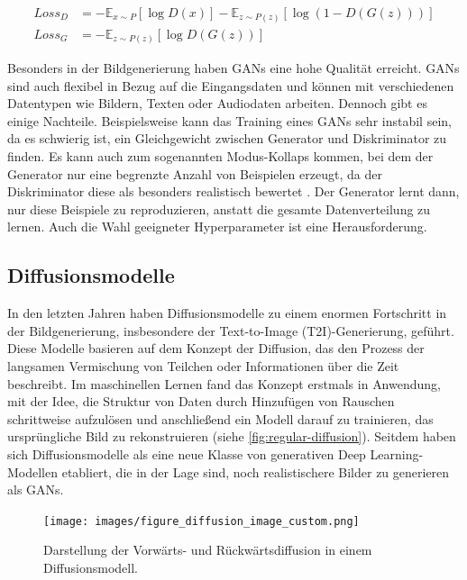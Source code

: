 \begin{equation}
	\begin{aligned}
		Loss_D &= -\mathbb{E}_{x \sim P}[\log D(x)] - \mathbb{E}_{z \sim P(z)}[\log(1 - D(G(z)))] \\
		Loss_G &= -\mathbb{E}_{z \sim P(z)}[\log D(G(z))]
	\end{aligned}
	\label{eq:gan-loss}
\end{equation}

Besonders in der Bildgenerierung haben GANs eine hohe Qualität erreicht. GANs sind auch flexibel in Bezug auf die Eingangsdaten und können mit verschiedenen Datentypen wie Bildern, Texten oder Audiodaten arbeiten. Dennoch gibt es einige Nachteile. Beispielsweise kann das Training eines GANs sehr instabil sein, da es schwierig ist, ein Gleichgewicht zwischen Generator und Diskriminator zu finden. Es kann auch zum sogenannten Modus-Kollaps kommen, bei dem der Generator nur eine begrenzte Anzahl von Beispielen erzeugt, da der Diskriminator diese als besonders realistisch bewertet \parencite{Foster2020gendeeplearning}. Der Generator lernt dann, nur diese Beispiele zu reproduzieren, anstatt die gesamte Datenverteilung zu lernen. Auch die Wahl geeigneter Hyperparameter ist eine Herausforderung.

\subsection{Diffusionsmodelle} \label{subsec:diffusion-models}

In den letzten Jahren haben Diffusionsmodelle zu einem enormen Fortschritt in der Bildgenerierung, insbesondere der Text-to-Image (T2I)-Generierung, geführt. Diese Modelle basieren auf dem Konzept der Diffusion, das den Prozess der langsamen Vermischung von Teilchen oder Informationen über die Zeit beschreibt. Im maschinellen Lernen fand das Konzept erstmals in \parencite{SohlDickstein2015diffusionmodels} Anwendung, mit der Idee, die Struktur von Daten durch Hinzufügen von Rauschen schrittweise aufzulösen und anschließend ein Modell darauf zu trainieren, das ursprüngliche Bild zu rekonstruieren (siehe \autoref{fig:regular-diffusion}). Seitdem haben sich Diffusionsmodelle als eine neue Klasse von generativen Deep Learning-Modellen etabliert, die in der Lage sind, noch realistischere Bilder zu generieren als GANs.

\begin{figure}[h]
	\centering
	\texttt{[image: images/figure\_diffusion\_image\_custom.png]}
	\caption[Darstellung der Vorwärts- und Rückwärtsdiffusion in einem Diffusionsmodell.]{Darstellung der Vorwärts- und Rückwärtsdiffusion in einem Diffusionsmodell.}
	\label{fig:regular-diffusion}
\end{figure}

